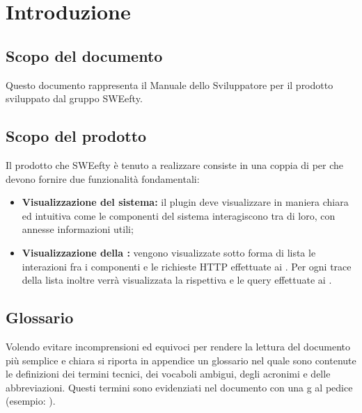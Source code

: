 \section{Introduzione}
\label{sec:intro}
	\subsection{Scopo del documento}
	Questo documento rappresenta il Manuale dello Sviluppatore per il prodotto  sviluppato dal gruppo SWEefty.
	
	\subsection{Scopo del prodotto}
	Il prodotto che SWEefty è tenuto a realizzare consiste in una coppia di  per  che devono fornire due funzionalità fondamentali:
	\begin{itemize}
		\item \textbf{Visualizzazione  del sistema:} il plugin deve visualizzare in maniera chiara ed intuitiva come le componenti del sistema interagiscono tra di loro, con annesse informazioni utili;
		\item \textbf{Visualizzazione della :} vengono visualizzate sotto forma di lista le interazioni fra i componenti e le richieste HTTP effettuate ai . Per ogni trace della lista inoltre verrà visualizzata la rispettiva  e le query effettuate ai .
	\end{itemize}

\subsection{Glossario}
Volendo evitare incomprensioni ed equivoci per rendere la lettura del documento più semplice e chiara si riporta in appendice un glossario nel quale sono contenute le definizioni dei termini tecnici, dei vocaboli ambigui, degli acronimi e delle abbreviazioni. Questi termini sono evidenziati nel documento con una g al pedice (esempio: ).
